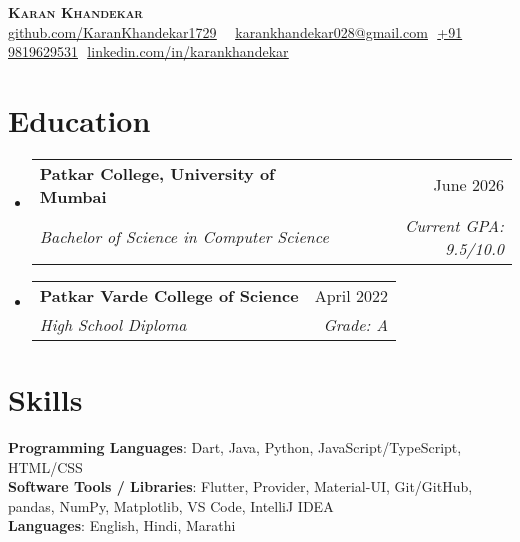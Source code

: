 \documentclass[letterpaper,11pt]{article}
\makeatletter
\newcommand{\resumeSubheading}[4]{
  \vspace{-2pt}\item
    \begin{tabular*}{0.97\textwidth}[t]{l@{\extracolsep{\fill}}r}
      \textbf{#1} & #2 \\
      \textit{\small#3} & \textit{\small #4} \\
    \end{tabular*}\vspace{-7pt}
}
\newcommand{\resumeSubHeadingListStart}{\begin{itemize}[leftmargin=0.15in, label={}]}
\newcommand{\resumeSubHeadingListEnd}{\end{itemize}}
\makeatother
\begin{document}
\begin{flushright}
  \vspace{-4pt}
\end{flushright}

\vspace{-7pt}

\begin{center}
    \textbf{\Huge \scshape Karan Khandekar} \\ \vspace{8pt}
    \small 
    \faGithub
    \href{github.com/KaranKhandekar1729}{\underline{github.com/KaranKhandekar1729}} $  $
    \faCode $  $
    \faEnvelope$  $
    \href{mailto:karankhandekar028@gmail.com}
    {\underline{karankhandekar028@gmail.com}}
    \faPhone$  $
    \underline{+91 9819629531}
    \faLinkedin$  $
    \href{linkedin.com/in/karankhandekar}{\underline{linkedin.com/in/karankhandekar}} $  $
\end{center}

\section{Education}
  \resumeSubHeadingListStart
    \resumeSubheading
        {Patkar College, University of Mumbai}{June 2026}
        {Bachelor of Science in Computer Science}{Current GPA: 9.5/10.0}
  
    \resumeSubheading
      {Patkar Varde College of Science}{April 2022}
      {High School Diploma}{Grade: A}
      

  \resumeSubHeadingListEnd

\section{Skills}
 \begin{itemize}[leftmargin=0.15in, label={}]
    \small{\item{
    
     \textbf{Programming Languages}{: Dart, Java, Python, JavaScript/TypeScript, HTML/CSS} \\
     
     \textbf{Software Tools / Libraries}{: Flutter, Provider, Material-UI, Git/GitHub, pandas, NumPy, Matplotlib, VS Code, IntelliJ IDEA} \\

     \textbf{Languages}{: English, Hindi, Marathi} \\
     
    }}
 \end{itemize}
\end{document}
